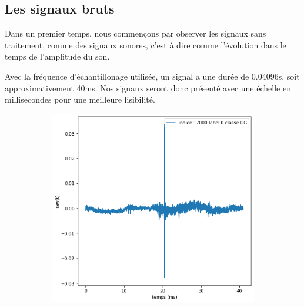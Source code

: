 \hypertarget{Signaux-Bruts}{%
\subsection{Les signaux bruts}
\label{Signaux-Bruts}}

Dans un premier temps, nous commençons par observer les signaux sans traitement, comme des signaux sonores, c'est à dire comme l'évolution dans le temps de l'amplitude du son.

Avec la fréquence d'échantillonage utilisée, un signal a une durée de 0.04096s,
soit approximativement 40ms.
Nos signaux seront donc présenté avec une échelle en millisecondes pour une
meilleure lisibilité.

\begin{figure}[!h]
\centering
	\begin{subfigure}[b]{0.3\textwidth}
    \includegraphics[width=\textwidth]{./images/indice17000Spectro1Dlabel0classeGGsansprocessingsanszoom.png}
    \caption{}
  	\end{subfigure}
  	\begin{subfigure}[b]{0.3\textwidth}

\end{subfigure}
\end{figure}
